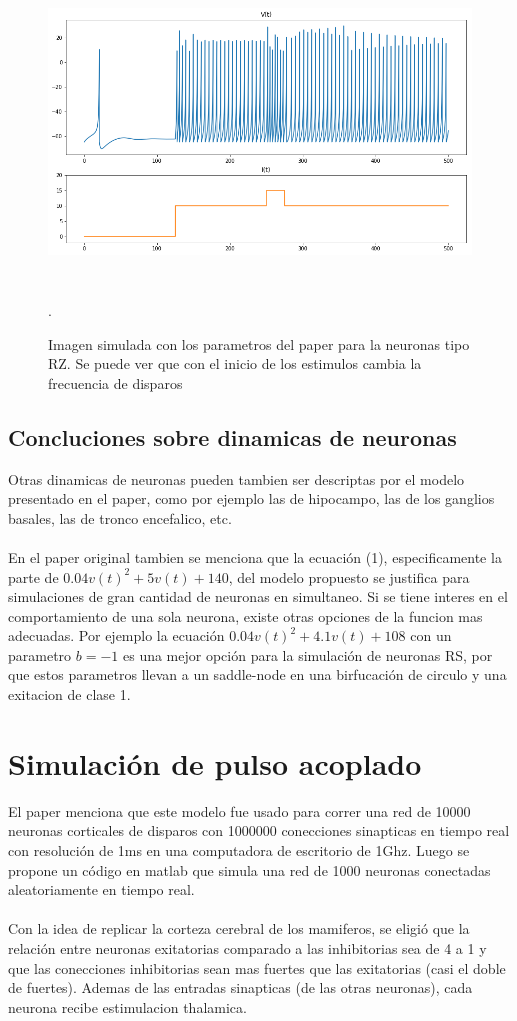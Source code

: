 \documentclass[12pt]{article}
\begin{document}
\begin{figure}[h!]
    \centering
        \includegraphics[height=8cm]{images/RZ.png}
    \caption[fontsize=2pt]{Imagen simulada con los parametros del paper para la neuronas tipo RZ. Se puede ver que con el inicio de los estimulos cambia la frecuencia de disparos}.
\end{figure}

\subsection{Concluciones sobre dinamicas de neuronas}

Otras dinamicas de neuronas pueden tambien ser descriptas por el modelo presentado en el paper, como por ejemplo las de hipocampo, las de los ganglios basales, las de tronco encefalico, etc. \\ \\
En el paper original tambien se menciona que la ecuación (1), especificamente la parte de $0.04 v(t)^2 + 5 v(t) + 140$, del modelo propuesto se justifica para simulaciones de gran cantidad de neuronas en simultaneo.
Si se tiene interes en el comportamiento de una sola neurona, existe otras opciones de la funcion mas adecuadas. Por ejemplo la ecuación $0.04 v(t)^2 + 4.1 v(t) + 108$ con un parametro $b = -1$ es una mejor opción para la simulación de neuronas RS, por que
estos parametros llevan a un saddle-node en una birfucación de circulo y una exitacion de clase 1. \cite{saddleNode}

\section{Simulación de pulso acoplado}
El paper menciona que este modelo fue usado para correr una red de 10000 neuronas corticales de disparos con 1000000 conecciones sinapticas en tiempo real con resolución de 1ms en una computadora de escritorio de 1Ghz.
Luego se propone un código en matlab que simula una red de 1000 neuronas conectadas aleatoriamente en tiempo real. \\ \\
Con la idea de replicar la corteza cerebral de los mamiferos, se eligió que la relación entre neuronas exitatorias comparado a las inhibitorias sea de 4 a 1 y que las conecciones inhibitorias sean mas fuertes que las exitatorias (casi el doble de fuertes).
Ademas de las entradas sinapticas (de las otras neuronas), cada neurona recibe estimulacion thalamica. \\
\end{document}
